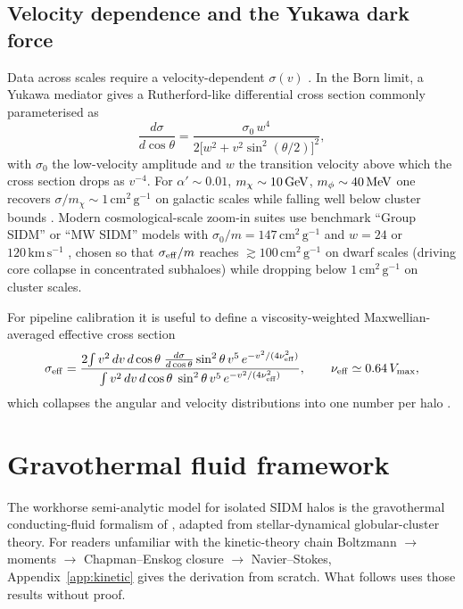 \documentclass[12pt]{article}
\newcommand{\cmg}{\,\mathrm{cm^2\,g^{-1}}}
\newcommand{\kms}{\,\mathrm{km\,s^{-1}}}
\newcommand{\smx}{\sigma/m_\chi}
\begin{document}
\subsection{Velocity dependence and the Yukawa dark force}
\label{sec:vdep}

Data across scales require a velocity-dependent $\sigma(v)$
\citep{Kaplinghat2016,TulinYu2018}.  In the Born limit, a Yukawa
mediator gives a Rutherford-like differential cross section commonly
parameterised as
%
\begin{equation}
  \frac{d\sigma}{d\cos\theta}
    = \frac{\sigma_0\,w^4}{2\bigl[w^2 + v^2\sin^2(\theta/2)\bigr]^2},
  \label{eq:rutherford_sidm}
\end{equation}
%
with $\sigma_0$ the low-velocity amplitude and $w$ the transition
velocity above which the cross section drops as $v^{-4}$.
For $\alpha'\sim 0.01$, $m_\chi\sim 10\,{\rm GeV}$, $m_\phi\sim
40\,{\rm MeV}$ one recovers $\smx\sim 1\cmg$ on galactic scales while
falling well below cluster bounds
\citep{Kaplinghat2016,TulinYu2018}.  Modern cosmological-scale
zoom-in suites use benchmark ``Group SIDM'' or ``MW SIDM'' models with
$\sigma_0/m = 147\cmg$ and $w = 24$ or $120\kms$
\citep{Nadler2023,Palubski2025}, chosen so that $\sigma_{\rm eff}/m$
reaches $\gtrsim 100\cmg$ on dwarf scales (driving core collapse in
concentrated subhaloes) while dropping below $1\cmg$ on cluster
scales.

For pipeline calibration it is useful to define a viscosity-weighted
Maxwellian-averaged effective cross section
%
\begin{equation}
  \sigma_{\rm eff}
    = \frac{2\!\int v^2\,dv\,d\cos\theta\;
      \frac{d\sigma}{d\cos\theta}\sin^2\theta\,v^5\,
      e^{-v^2/(4\nu_{\rm eff}^2)}}
      {\int v^2\,dv\,d\cos\theta\;
      \sin^2\theta\,v^5\,e^{-v^2/(4\nu_{\rm eff}^2)}},
  \qquad
  \nu_{\rm eff}\simeq 0.64\,V_{\rm max},
  \label{eq:sigma_eff}
\end{equation}
%
which collapses the angular and velocity distributions into one number
per halo \citep{Nadler2023}.

\section{Gravothermal fluid framework}
\label{sec:fluid}

The workhorse semi-analytic model for isolated SIDM halos is the
gravothermal conducting-fluid formalism of
\citet{Balberg2002}, adapted from stellar-dynamical globular-cluster
theory.  For readers unfamiliar with the kinetic-theory chain
Boltzmann $\to$ moments $\to$ Chapman--Enskog closure $\to$
Navier--Stokes, Appendix~\ref{app:kinetic} gives the derivation from
scratch.  What follows uses those results without proof.
\end{document}
